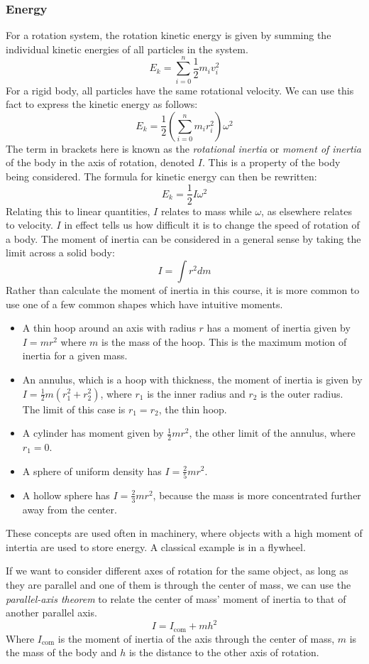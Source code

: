 \documentclass[12pt]{report}
\begin{document}
\begin{flushleft}
\subsubsection*{Energy}
For a rotation system, the rotation kinetic energy is given by summing the
individual kinetic energies of all particles in the system.
\[E_k = \sum^n_{i=0} \frac{1}{2}m_iv_i^2\]
For a rigid body, all particles have the same rotational velocity. We can use
this fact to express the kinetic energy as follows:
\[E_k = \frac{1}{2}\left(\sum^n_{i=0}m_ir_i^2\right)\omega^2\]
The term in brackets here is known as the \textit{rotational inertia} or 
\textit{moment of inertia} of the body in the axis of rotation, denoted \(I\).
This is a property of the body being considered. The formula for kinetic energy
can then be rewritten:
\[E_k = \frac{1}{2}I\omega^2\]
Relating this to linear quantities, \(I\) relates to mass while \(\omega\), as 
elsewhere relates to velocity. \(I\) in effect tells us how difficult it is to
change the speed of rotation of a body. The moment of inertia can be considered
in a general sense by taking the limit across a solid body:
\[I = \int r^2dm\]
Rather than calculate the moment of inertia in this course, it is more common
to use one of a few common shapes which have intuitive moments.
\begin{itemize}
    \item A thin hoop around an axis with radius \(r\) has a moment of inertia
    given by \(I = mr^2\) where \(m\) is the mass of the hoop. This is the 
    maximum motion of inertia for a given mass.
    \item An annulus, which is a hoop with thickness, the moment of inertia is
    given by \(I = \frac{1}{2}m(r_1^2 + r_2^2)\), where \(r_1\) is the inner
    radius and \(r_2\) is the outer radius. The limit of this case is 
    \(r_1 = r_2\), the thin hoop.
    \item A cylinder has moment given by \(\frac{1}{2}mr^2\), the other limit
    of the annulus, where \(r_1 = 0\). 
    \item A sphere of uniform density has \(I = \frac{2}{5}mr^2\).
    \item A hollow sphere has \(I = \frac{2}{3}mr^2\), because the mass is more
    concentrated further away from the center.
\end{itemize}
These concepts are used often in machinery, where objects with a high moment of
intertia are used to store energy. A classical example is in a flywheel.

\bigskip
If we want to consider different axes of rotation for the same object, as long
as they are parallel and one of them is through the center of mass, we can use
the \textit{parallel-axis theorem} to relate the center of mass' moment of 
inertia to that of another parallel axis.
\[I = I_\mathrm{com} + mh^2\]
Where \(I_\mathrm{com}\) is the moment of inertia of the axis through the 
center of mass, \(m\) is the mass of the body and \(h\) is the distance to
the other axis of rotation.


\end{flushleft}
\end{document}

